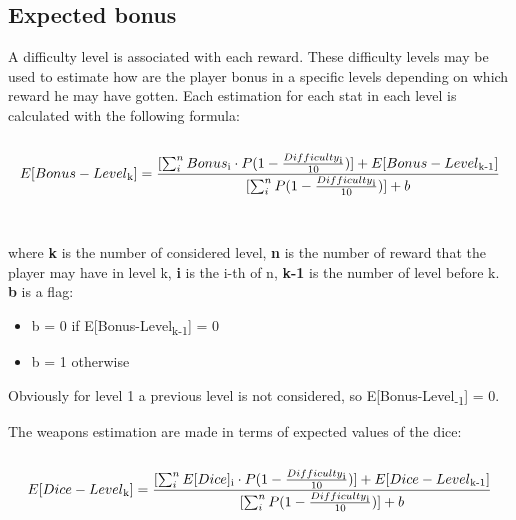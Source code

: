 \subsection{Expected bonus}
A difficulty level is associated with each reward. These difficulty levels may be used to estimate how are the player bonus in a specific levels depending on which reward he may have gotten. Each estimation for each stat in each level is calculated with the following formula: \\\\
\begin{equation}
  E[Bonus-Level\textsubscript{k}]= \frac{[\sum_{i}^{n} Bonus\textsubscript{i}
  \cdot
  P(1-\frac{Difficulty\textsubscript{i}}{10})]+E[Bonus-Level\textsubscript{k-1}]}
  {[\sum_{i}^{n}P(1-\frac{Difficulty\textsubscript{i}}{10})]+b}
\end{equation}
\\\\
where \textbf{k} is the number of considered level, \textbf{n} is the number of reward that the player may have in level k, \textbf{i} is the i-th of n, \textbf{k-1} is the number of level before k.\\
\textbf{b} is a flag:
\begin{itemize}
  \item b = 0 if E[Bonus-Level\textsubscript{k-1}] = 0
  \item b = 1 otherwise
\end{itemize}
Obviously for level 1 a previous level is not considered, so E[Bonus-Level\textsubscript{-1}] = 0.

The weapons estimation are made in terms of expected values of the dice:\\\\
\begin{equation}
  E[Dice-Level\textsubscript{k}]= \frac{[\sum_{i}^{n} E[Dice]\textsubscript{i}
  \cdot
  P(1-\frac{Difficulty\textsubscript{i}}{10})]+E[Dice-Level\textsubscript{k-1}]}
  {[\sum_{i}^{n}P(1-\frac{Difficulty\textsubscript{i}}{10})]+b}
\end{equation}


